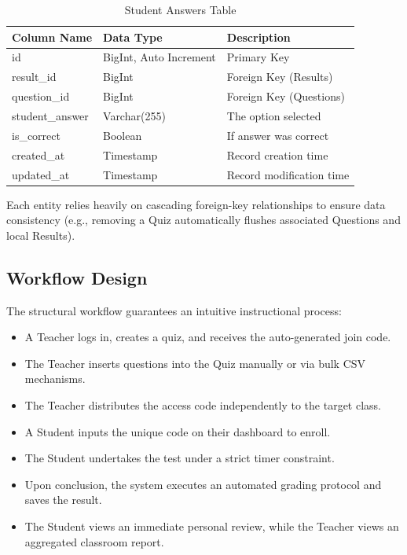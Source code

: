 \begin{table}[H]
    \centering
    \begin{tabular}{|l|l|l|}
        \hline
        \textbf{Column Name} & \textbf{Data Type} & \textbf{Description} \\
        \hline
        id & BigInt, Auto Increment & Primary Key \\
        result\_id & BigInt & Foreign Key (Results) \\
        question\_id & BigInt & Foreign Key (Questions) \\
        student\_answer& Varchar(255) & The option selected \\
        is\_correct & Boolean & If answer was correct \\
        created\_at & Timestamp & Record creation time \\
        updated\_at & Timestamp & Record modification time \\
        \hline
    \end{tabular}
    \caption{Student Answers Table}
    \label{tab:student_answers}
\end{table}

Each entity relies heavily on cascading foreign-key relationships to ensure data consistency (e.g., removing a Quiz automatically flushes associated Questions and local Results). 

\subsection{Workflow Design}

The structural workflow guarantees an intuitive instructional process:

\begin{itemize}
    \item A Teacher logs in, creates a quiz, and receives the auto-generated join code.
    \item The Teacher inserts questions into the Quiz manually or via bulk CSV mechanisms.
    \item The Teacher distributes the access code independently to the target class.
    \item A Student inputs the unique code on their dashboard to enroll.
    \item The Student undertakes the test under a strict timer constraint.
    \item Upon conclusion, the system executes an automated grading protocol and saves the result.
    \item The Student views an immediate personal review, while the Teacher views an aggregated classroom report.
\end{itemize}


